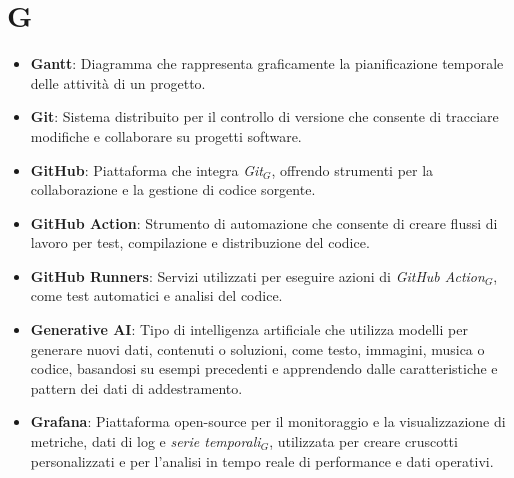 \section{G}
\begin{itemize}
    \item \textbf{Gantt}: Diagramma che rappresenta graficamente la pianificazione temporale delle attività di un progetto.
    \item \textbf{Git}: Sistema distribuito per il controllo di versione che consente di tracciare modifiche e collaborare su progetti software.
    \item \textbf{GitHub}: Piattaforma che integra \textit{Git}$_G$, offrendo strumenti per la collaborazione e la gestione di codice sorgente.
    \item \textbf{GitHub Action}: Strumento di automazione che consente di creare flussi di lavoro per test, compilazione e distribuzione del codice.
    \item \textbf{GitHub Runners}: Servizi utilizzati per eseguire azioni di \textit{GitHub Action}$_G$, come test automatici e analisi del codice.
    \item \textbf{Generative AI}: Tipo di intelligenza artificiale che utilizza modelli per generare nuovi dati, contenuti o soluzioni, come testo, immagini, musica o codice, basandosi su esempi precedenti e apprendendo dalle caratteristiche e pattern dei dati di addestramento.
    \item \textbf{Grafana}: Piattaforma open-source per il monitoraggio e la visualizzazione di metriche, dati di log e \textit{serie temporali$_G$}, utilizzata per creare cruscotti personalizzati e per l'analisi in tempo reale di performance e dati operativi.

\end{itemize}
